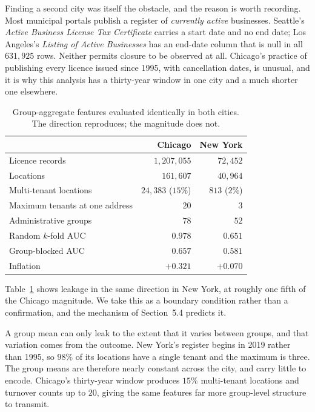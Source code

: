 \documentclass[11pt]{article}
\begin{document}
Finding a second city was itself the obstacle, and the reason is worth
recording. Most municipal portals publish a register of \emph{currently active}
businesses. Seattle's \emph{Active Business License Tax Certificate} carries a
start date and no end date; Los Angeles's \emph{Listing of Active Businesses}
has an end-date column that is null in all $631{,}925$ rows. Neither permits
closure to be observed at all. Chicago's practice of publishing every licence
issued since 1995, with cancellation dates, is unusual, and it is why this
analysis has a thirty-year window in one city and a much shorter one elsewhere.

\begin{table}[t]
\centering
\begin{tabular}{lrr}
\toprule
 & Chicago & New York \\
\midrule
Licence records            & $1{,}207{,}055$ & $72{,}452$ \\
Locations                  & $161{,}607$ & $40{,}964$ \\
Multi-tenant locations     & $24{,}383$ ($15\%$) & $813$ ($2\%$) \\
Maximum tenants at one address & $20$ & $3$ \\
Administrative groups      & $78$ & $52$ \\
\midrule
Random $k$-fold AUC        & $0.978$ & $0.651$ \\
Group-blocked AUC          & $0.657$ & $0.581$ \\
Inflation                  & $+0.321$ & $+0.070$ \\
\bottomrule
\end{tabular}
\caption{Group-aggregate features evaluated identically in both cities. The
direction reproduces; the magnitude does not.}
\label{tab:nyc}
\end{table}

Table~\ref{tab:nyc} shows leakage in the same direction in New York, at roughly
one fifth of the Chicago magnitude. We take this as a boundary condition rather
than a confirmation, and the mechanism of Section~5.4 predicts it.

A group mean can only leak to the extent that it varies between groups, and that
variation comes from the outcome. New York's register begins in 2019 rather than
1995, so $98\%$ of its locations have a single tenant and the maximum is three.
The group means are therefore nearly constant across the city, and carry little
to encode. Chicago's thirty-year window produces $15\%$ multi-tenant locations
and turnover counts up to $20$, giving the same features far more group-level
structure to transmit.
\end{document}
